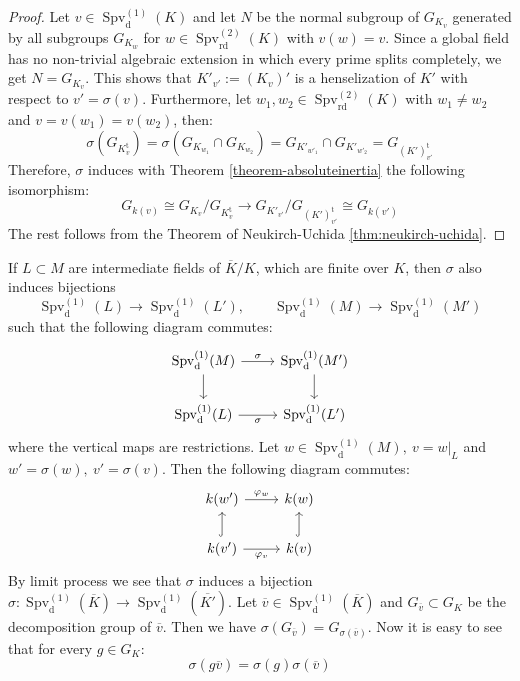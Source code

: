 \begin{proof}
Let $v\in\operatorname{Spv}_\text{d}^{(1)}(K)$ and let $N$ be the normal subgroup of $G_{K_v}$ generated by all subgroups $G_{K_w}$ for $w\in\operatorname{Spv}_\text{rd}^{(2)}(K)$ with $v(w) = v$. Since a global field has no non-trivial algebraic extension in which every prime splits completely, we get $N=G_{K_v}$. This shows that $K'_{v'} := (K_v)'$ is a henselization of $K'$ with respect to $v'=\sigma(v)$. Furthermore, let $w_1,w_2\in\operatorname{Spv}_\text{rd}^{(2)}(K)$ with $w_1\neq w_2$ and $v=v(w_1)=v(w_2)$, then:
\[ \sigma(G_{K^\text{t}_v}) = \sigma(G_{K_{w_1}}\cap G_{K_{w_2}}) = G_{K'_{w'_1}}\cap G_{K'_{w'_2}} = G_{(K')^\text{t}_{v'}} \]
Therefore, $\sigma$ induces with Theorem \ref{theorem-absoluteinertia} the following isomorphism:
\[ G_{k(v)} \cong G_{K_v}/G_{K_v^\text{t}} \to G_{K'_{v'}}/G_{(K')_{v'}^\text{t}}\cong G_{k(v')} \]
The rest follows from the Theorem of Neukirch-Uchida \ref{thm:neukirch-uchida}.
\end{proof}

\begin{remark}\label{3.3}
If $L\subset M$ are intermediate fields of $\overline{K}/K$, which are finite over $K$, then $\sigma$ also induces bijections
\[ \operatorname{Spv}_\text{d}^{(1)}(L) \to \operatorname{Spv}_\text{d}^{(1)}(L'),\qquad \operatorname{Spv}_\text{d}^{(1)}(M) \to \operatorname{Spv}_\text{d}^{(1)}(M') \]
such that the following diagram commutes:
\[\begin{tikzcd}
\operatorname{Spv}_\text{d}^{(1)}(M) \rar["\sigma"]\dar & \operatorname{Spv}_\text{d}^{(1)}(M')\dar\\
\operatorname{Spv}_\text{d}^{(1)}(L) \rar["\sigma"'] & \operatorname{Spv}_\text{d}^{(1)}(L')
\end{tikzcd}\]
where the vertical maps are restrictions. Let $w\in\operatorname{Spv}_\text{d}^{(1)}(M),\ v=w|_L$ and $w'=\sigma(w),\ v'=\sigma(v)$. Then the following diagram commutes:
\[ \begin{tikzcd}
k(w') \rar["\varphi_w"] & k(w)\\
k(v') \rar["\varphi_v"']\uar[hook] & k(v)\uar[hook]
\end{tikzcd} \]
By limit process we see that $\sigma$ induces a bijection $\sigma: \operatorname{Spv}_\text{d}^{(1)}(\overline{K})\to \operatorname{Spv}_\text{d}^{(1)}(\overline{K'})$. Let $\overline{v}\in \operatorname{Spv}_\text{d}^{(1)}(\overline{K})$ and $G_{\overline{v}}\subset G_K$ be the decomposition group of $\overline{v}$. Then we have $\sigma(G_{\overline{v}}) = G_{\sigma(\overline{v})}$. Now it is easy to see that for every $g\in G_K$:
\[ \sigma(g\overline{v}) = \sigma(g)\sigma(\overline{v}) \]
\end{remark}

